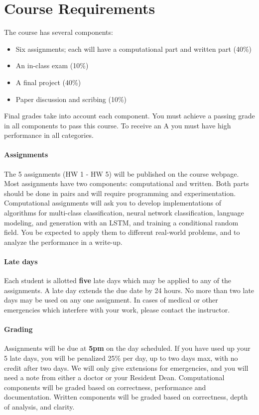 \documentclass[11pt]{article}
\begin{document}
\vspace {0.25cm}
\section{Course Requirements}

The course has several components:

\begin{itemize}
\item Six assignments; each will have a computational part and written part (40\%)
\item An in-class exam (10\%)
\item A final project  (40\%)
\item Paper discussion and scribing (10\%)
\end{itemize}


\noindent Final grades take into account each component. You must
achieve a passing grade in all components to pass this course. To
receive an A you must have high performance in all categories.

\paragraph{Assignments}

The 5 assignments (HW 1 - HW 5) will be published on the course
webpage. Most assignments have two components: computational and
written. Both parts should be done in pairs
and will require programming and experimentation. Computational assignments will ask you to develop
implementations of algorithms for multi-class classification, neural
network classification, language modeling, and generation with an
LSTM, and training a conditional random field. You be expected to
apply them to different real-world problems, and to analyze the
performance in a write-up.

\paragraph{Late days} Each student is allotted \textbf{five} late days
which may be applied to any of the assignments.  A late day extends the
due date by 24 hours. No more than two late days may be used on any
one assignment. In cases of medical or other emergencies which
interfere with your work, please contact the
instructor.

\paragraph{Grading} Assignments will be due at \textbf{5pm} on the day
scheduled. If you have used up your 5 late days, you will be penalized
25\% per day, up to two days max, with no credit after two days. We
will only give extensions for emergencies, and you will need a note
from either a doctor or your Resident Dean. Computational components
will be graded based on correctness, performance and documentation.
Written components will be graded based on correctness, depth of
analysis, and clarity.
\end{document}
